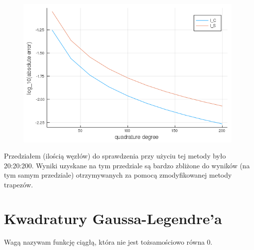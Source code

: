\documentclass{article}
\begin{document}
\begin{figure}[ht]
    \includegraphics[scale=0.5]{WykresClogabsolute.png}
    \label{wykresC}
\end{figure}

Przedziałem (ilością węzłów) do sprawdzenia przy użyciu tej metody było 20:20:200. Wyniki uzyskane na tym przedziale są bardzo zbliżone do wyników (na tym samym przedziale) otrzymywanych za pomocą zmodyfikowanej metody trapezów.


\section*{Kwadratury Gaussa-Legendre'a}
	Wagą nazywam funkcję ciągłą, która nie jest tożsamościowo równa 0.
\end{document}
